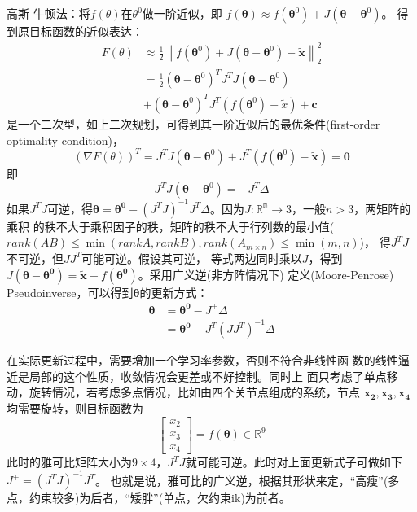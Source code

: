 \documentclass[lang=cn,newtx,10pt,scheme=chinese]{elegantbook}
\begin{document}
高斯-牛顿法：将$f(\theta)$在$\theta^0$做一阶近似，即
$f(\boldsymbol{\theta}) \approx f(\boldsymbol{\theta}^0) + J(\boldsymbol{\theta} - \boldsymbol{\theta}^0)$。
得到原目标函数的近似表达：
\begin{equation}
  \begin{aligned}
  F(\theta) & \approx \frac{1}{2}\left\|f\left(\boldsymbol{\theta}^0\right)+J\left(\boldsymbol{\theta}-\boldsymbol{\theta}^0\right)-\widetilde{\boldsymbol{x}}\right\|_2^2 \\
  & =\frac{1}{2}\left(\boldsymbol{\theta}-\boldsymbol{\theta}^0\right)^T J^T J\left(\boldsymbol{\theta}-\boldsymbol{\theta}^0\right) \\
  & +\left(\boldsymbol{\theta}-\boldsymbol{\theta}^0\right)^T J^T\left(f\left(\boldsymbol{\theta}^0\right)-\widetilde{x}\right)+\boldsymbol{c}
  \end{aligned}
\end{equation}
是一个二次型，如上二次规划，可得到其一阶近似后的最优条件(first-order optimality condition)，
$$
(\nabla F(\theta))^T=J^T J\left(\boldsymbol{\theta}-\boldsymbol{\theta}^0\right)+J^T\left(f\left(\boldsymbol{\theta}^0\right)-\widetilde{\boldsymbol{x}}\right)=\mathbf{0}
$$
即
\begin{equation}
  J^T J\left(\boldsymbol{\theta}-\boldsymbol{\theta}^0\right)=-J^T\Delta
\end{equation}
如果$J^T J$可逆，得$\boldsymbol{\theta} = \boldsymbol{\theta^0}
- (J^T J)^{-1} J^T \Delta$。因为$J:\mathbb{R^n}\rightarrow 3$，一般$n>3$，两矩阵的乘积
的秩不大于乘积因子的秩，矩阵的秩不大于行列数的最小值($rank(AB)\leq\min(rank A, rank B), rank(A_{m\times n}) \leq \min(m, n)$)，
得$J^T J$不可逆，但$J J^T$可能可逆。假设其可逆，
等式两边同时乘以$J$，得到$J(\boldsymbol{\theta} - \boldsymbol{\theta^0}) = 
\boldsymbol{\widetilde{x}} - f(\boldsymbol{\theta^0})$。采用广义逆(非方阵情况下)
定义(Moore-Penrose) Pseudoinverse，可以得到$\boldsymbol{\theta}$的更新方式：
\begin{equation}
  \begin{aligned}
    \boldsymbol{\theta} &= \boldsymbol{\theta^0} - J^{+}\Delta \\
    &= \boldsymbol{\theta^0} - J^T (J J^T)^{-1}\Delta
    \end{aligned}
\end{equation}

在实际更新过程中，需要增加一个学习率参数，否则不符合非线性函
数的线性逼近是局部的这个性质，收敛情况会更差或不好控制。同时上
面只考虑了单点移动，旋转情况，若考虑多点情况，比如由四个关节点组成的系统，节点
$\boldsymbol{x_2}, \boldsymbol{x_3}, \boldsymbol{x_4}$
均需要旋转，则目标函数为
\begin{equation}
  \left[\begin{array}{l}
  x_2 \\
  x_3 \\
  x_4
  \end{array}\right]=f(\boldsymbol{\theta}) \in \mathbb{R}^9
\end{equation}
此时的雅可比矩阵大小为$9\times 4$，$J^T J$就可能可逆。此时对上面更新式子可做如下$J^+ = (J^T J)^{-1}J^T$。
也就是说，雅可比的广义逆，根据其形状来定，“高瘦”(多点，约束较多)为后者，“矮胖”(单点，欠约束ik)为前者。
\end{document}
